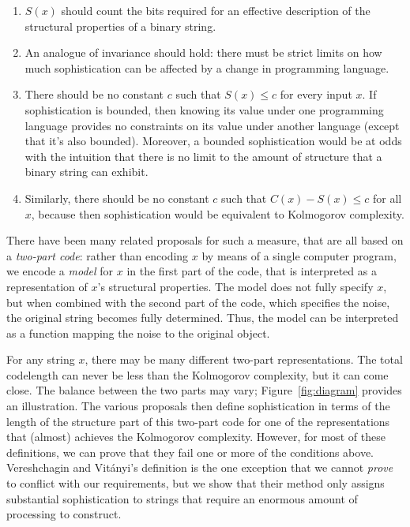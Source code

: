 \documentclass{style/llncs}
\begin{document}
\begin{enumerate}
\item $S(x)$ should count the bits required for an effective description of the structural properties of a binary string.
\item An analogue of invariance should hold: there must be strict limits on how much sophistication can be affected by a change in programming language.
\item There should be no constant $c$ such that $S(x)\le c$ for every input $x$. If sophistication is bounded, then knowing its value under one programming language provides no constraints on its value under another language (except that it's also bounded). Moreover, a bounded sophistication would be at odds with the intuition that there is no limit to the amount of structure that a binary string can exhibit.
\item Similarly, there should be no constant $c$ such that $C(x)-S(x)\le c$ for all $x$, because then sophistication would be equivalent to Kolmogorov complexity. 
\end{enumerate}
There have been many related proposals for such a measure, that are all based on a \emph{two-part code}: rather than encoding $x$ by means of a single computer program, we encode a \emph{model} for $x$ in the first part of the code, that is interpreted as a representation of $x$'s structural properties. The model does not fully specify $x$, but when combined with the second part of the code, which specifies the noise, the original string becomes fully determined. Thus, the model can be interpreted as a function mapping the noise to the original object.

For any string $x$, there may be many different two-part representations. The total codelength can never be less than the Kolmogorov complexity, but it can come close. The balance between the two parts may vary; Figure~\ref{fig:diagram} provides an illustration. The various proposals then define sophistication in terms of the length of the structure part of this two-part code for one of the representations that (almost) achieves the Kolmogorov complexity. However, for most of these definitions, we can prove that they fail one or more of the conditions above. Vereshchagin and Vit\'anyi's definition \cite{vitanyi2004meaningful} is the one exception that we cannot \emph{prove} to conflict with our requirements, but we show that their method only assigns substantial sophistication to strings that require an enormous amount of processing to construct.
\end{document}
